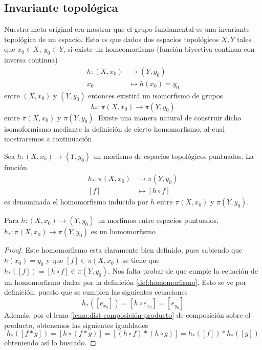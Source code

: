 {\subsection{Invariante topológica}
Nuestra meta original era mostrar que el grupo fundamental es una
invariante topológica de un espacio. Esto es que dados dos
espacios topológicos \(X,Y\) tales que \(x_0 \in X,\ y_0 \in Y\), si
existe un homeomorfismo (función biyectiva continua con inversa
continua)
\begin{align*}
  h : (X, x_0) &\longrightarrow (Y, y_0) \\
  x_0 &\longmapsto h(x_0) = y_0
\end{align*}
entre \((X, x_0)\) y \((Y, y_0)\) entonces existirá un isomorfismo de
grupos
\[ h_{*} : \pi (X, x_0) \longrightarrow \pi (Y, y_0) \]
entre \(\pi (X, x_0)\) y \(\pi (Y, y_0)\). Existe una manera natural de
construir dicho isomoformismo mediante la definición de cierto
homomorfismo, al cual mostraremos a continuación
\begin{definicion} \label{def:homomorfismo-inducido}
  Sea \(h : (X, x_0) \longrightarrow (Y, y_0)\) un morfismo de
  espacios topológicos puntuados. La función
  \begin{align*}
    h_* : \pi (X, x_0) &\longrightarrow \pi (Y, y_0) \\
    [f] &\longmapsto [h \circ f]
  \end{align*}
  es denominada el homomorfismo inducido por \(h\) entre \(\pi (X,
  x_0)\) y \(\pi (Y, y_0)\).
\end{definicion}
\begin{teorema}
  Para \(h : (X, x_0) \to (Y, y_0)\) un morfimos entre espacios
  puntuados, \(h_* : \pi (X, x_0) \to \pi (Y, y_0)\) es un homomorfismo
\end{teorema}
\begin{proof}
  Este homomorfismo esta claramente bien definido, pues sabiendo que \(h
  (x_0) = y_0\) y que \([f] \in \pi (X, x_0)\) se tiene que \(h_* ([f]) =
  [h \circ f] \in \pi (Y, y_0)\). Nos falta probar de que cumple la
  ecuación de un homomorfismo dadas por la definición
  \ref{def:homomorfismo}. Esto se ve por definición, puesto que se cumplen
  las siguientes ecuaciones
  \[ h_{*} ([e_{x_0}]) = [h \circ e_{x_0}] = [e_{y_0}]\]
  Además, por el lema \ref{lema:dist-composición-producto} de composición
  sobre el producto, obtenemos las siguientes igualdades
  \[ h_{*} ([f * g]) = [h \circ (f * g)] = [(h \circ f) * (h \circ g)]
    = h_{*} ([f]) * h_{*} ([g])\]
  obteniendo así lo buscado.

\end{proof}}
